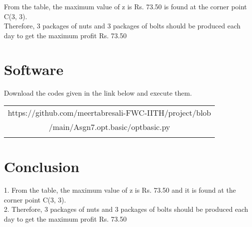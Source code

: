 \documentclass[journal,10pt,twocolumn]{article}
\begin{document}
\begin{flushleft}
From the table, the maximum value of z is Rs. 73.50 is found at the corner point C(3, 3).\\
\vspace{0.25cm}
Therefore, 3 packages of nuts and 3 packages of bolts should be produced each day to get the maximum profit Rs. 73.50
\end{flushleft}
\section{Software}
\centering
Download the codes given in the link below and execute them.\\
\begin{table}[h]
\centering
\begin{tabular}{|c|} \hline
\rule{0pt}{10pt} 
https://github.com/meertabresali-FWC-IITH/project/blob \\
/main/Asgn7.opt.basic/optbasic.py\\
\\\hline
 \end{tabular}
\end{table}
\section{Conclusion}
\begin{flushleft}
1. From the table, the maximum value of z is Rs. 73.50 and it is found at the corner point C(3, 3).\\
\vspace{0.25cm}
2. Therefore, 3 packages of nuts and 3 packages of bolts should be produced each day to get the maximum profit Rs. 73.50
\end{flushleft}
\end{document}
